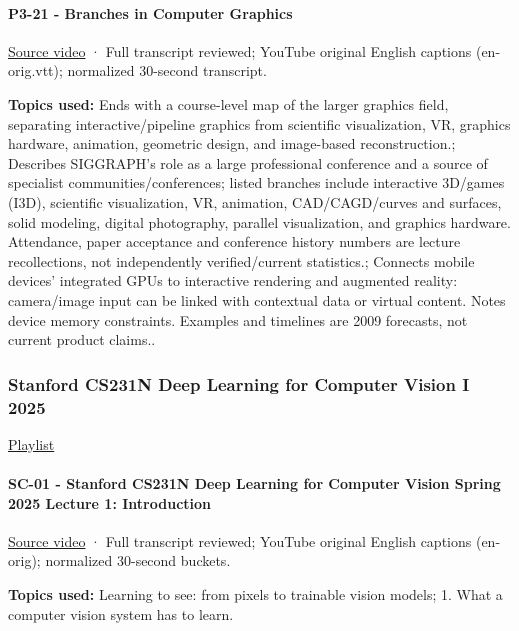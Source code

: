 \paragraph{P3-21 - Branches in Computer Graphics}\label{p3-21---branches-in-computer-graphics}

\href{https://www.youtube.com/watch?v=NEIJW3ZJ1GE}{Source video} · Full transcript reviewed; YouTube original English captions (en-orig.vtt); normalized 30-second transcript.

\textbf{Topics used:} Ends with a course-level map of the larger graphics field, separating interactive/pipeline graphics from scientific visualization, VR, graphics hardware, animation, geometric design, and image-based reconstruction.; Describes SIGGRAPH's role as a large professional conference and a source of specialist communities/conferences; listed branches include interactive 3D/games (I3D), scientific visualization, VR, animation, CAD/CAGD/curves and surfaces, solid modeling, digital photography, parallel visualization, and graphics hardware. Attendance, paper acceptance and conference history numbers are lecture recollections, not independently verified/current statistics.; Connects mobile devices' integrated GPUs to interactive rendering and augmented reality: camera/image input can be linked with contextual data or virtual content. Notes device memory constraints. Examples and timelines are 2009 forecasts, not current product claims..

\subsubsection{Stanford CS231N Deep Learning for Computer Vision I 2025}\label{stanford-cs231n-deep-learning-for-computer-vision-i-2025}

\href{https://www.youtube.com/playlist?list=PLoROMvodv4rOmsNzYBMe0gJY2XS8AQg16}{Playlist}

\paragraph{SC-01 - Stanford CS231N Deep Learning for Computer Vision Spring 2025 Lecture 1: Introduction}\label{sc-01---stanford-cs231n-deep-learning-for-computer-vision-spring-2025-lecture-1-introduction}

\href{https://www.youtube.com/watch?v=2fq9wYslV0A}{Source video} · Full transcript reviewed; YouTube original English captions (en-orig); normalized 30-second buckets.

\textbf{Topics used:} Learning to see: from pixels to trainable vision models; 1. What a computer vision system has to learn.

